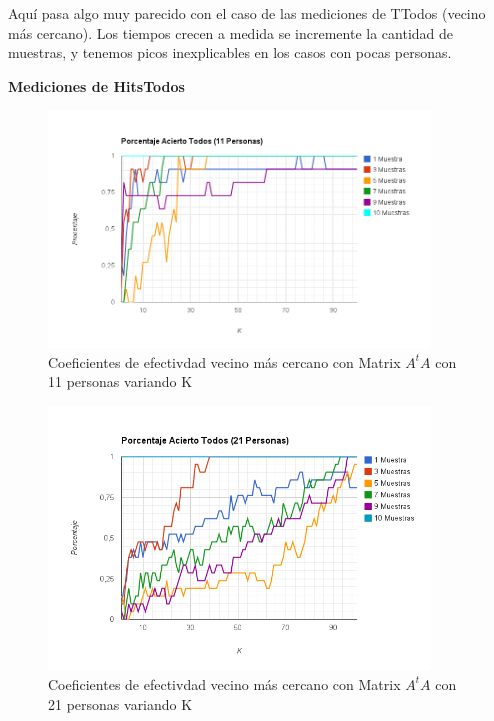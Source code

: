 Aquí pasa algo muy parecido con el caso de las mediciones de TTodos (vecino más cercano). Los
tiempos crecen a medida se incremente la cantidad de muestras, y tenemos picos inexplicables en los
casos con pocas personas.

\textbf{Mediciones de HitsTodos }

\begin{figure}[H]
\includegraphics[width=0.90\textwidth]{img/image10.png}
     \caption{Coeficientes de efectivdad vecino más cercano con Matrix $A^tA$ con 11 personas variando K}
\end{figure}

\begin{figure}[H]
\includegraphics[width=0.90\textwidth]{img/image11.png}
     \caption{Coeficientes de efectivdad vecino más cercano con Matrix $A^tA$ con 21 personas variando K}
\end{figure}

